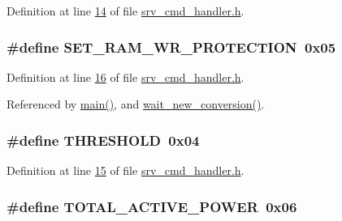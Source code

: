 Definition at line \hyperlink{a00043_source_l00014}{14} of file \hyperlink{a00043_source}{srv\-\_\-cmd\-\_\-handler.\-h}.

\hypertarget{a00043_a5b534b9caab512045a6e762f3930a501}{
\subsubsection[{S\-E\-T\-\_\-\-R\-A\-M\-\_\-\-W\-R\-\_\-\-P\-R\-O\-T\-E\-C\-T\-I\-O\-N}]{\setlength{\rightskip}{0pt plus 5cm}\#define S\-E\-T\-\_\-\-R\-A\-M\-\_\-\-W\-R\-\_\-\-P\-R\-O\-T\-E\-C\-T\-I\-O\-N~0x05}}\label{d6/d42/a00043_a5b534b9caab512045a6e762f3930a501}


Definition at line \hyperlink{a00043_source_l00016}{16} of file \hyperlink{a00043_source}{srv\-\_\-cmd\-\_\-handler.\-h}.



Referenced by \hyperlink{a00035_source_l00198}{main()}, and \hyperlink{a00035_source_l00122}{wait\-\_\-new\-\_\-conversion()}.

\hypertarget{a00043_a4679d8ea8690999a6c6c7c0cb245c879}{
\subsubsection[{T\-H\-R\-E\-S\-H\-O\-L\-D}]{\setlength{\rightskip}{0pt plus 5cm}\#define T\-H\-R\-E\-S\-H\-O\-L\-D~0x04}}\label{d6/d42/a00043_a4679d8ea8690999a6c6c7c0cb245c879}


Definition at line \hyperlink{a00043_source_l00015}{15} of file \hyperlink{a00043_source}{srv\-\_\-cmd\-\_\-handler.\-h}.

\hypertarget{a00043_a7d0d4057be5aaf168a22ee4379e6ff30}{
\subsubsection[{T\-O\-T\-A\-L\-\_\-\-A\-C\-T\-I\-V\-E\-\_\-\-P\-O\-W\-E\-R}]{\setlength{\rightskip}{0pt plus 5cm}\#define T\-O\-T\-A\-L\-\_\-\-A\-C\-T\-I\-V\-E\-\_\-\-P\-O\-W\-E\-R~0x06}}\label{d6/d42/a00043_a7d0d4057be5aaf168a22ee4379e6ff30}


